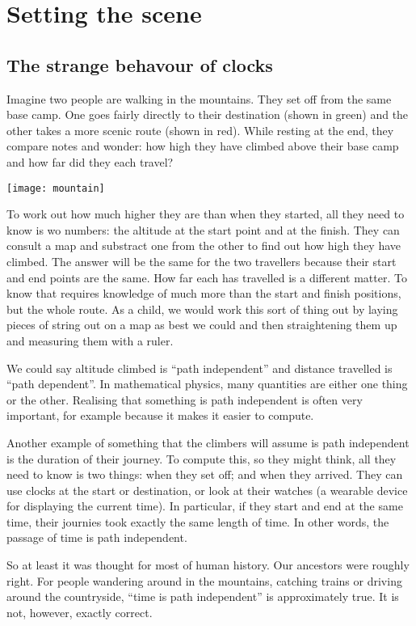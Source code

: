 \documentclass[a4paper]{report}
\begin{document}
\section*{Setting the scene}
\subsection*{The strange behavour of clocks}
Imagine two people are walking in the mountains. They set off from the same base camp. One goes fairly directly to their destination (shown in green) and the other takes a more scenic route (shown in red). While resting at the end, they compare notes and wonder: how high they have climbed above their base camp and how far did they each travel?

\texttt{[image: mountain]}

To work out how much higher they are than when they started, all they need to know is wo numbers: the altitude at the start point and at the finish. They can consult a map and substract one from the other to find out how high they have climbed. The answer will be the same for the two travellers because their start and end points are the same. 
How far each has travelled is a different matter. To know that requires knowledge of much more than the start and finish positions, but the whole route. As a child, we would work this sort of thing out by laying pieces of string out on a map as best we could and then straightening them up and measuring them with a ruler. 

We could say altitude climbed is ``path independent'' and distance travelled is ``path dependent''. In mathematical physics, many quantities are either one thing or the other. Realising that something is path independent is often very important, for example  because it makes it easier to compute. 

Another example of something that the climbers will assume is path independent is the duration of their journey. To compute this, so they might think, all they need to know is two things: when they set off; and when they arrived. They can use clocks at the start or destination, or look at their watches (a wearable device for displaying the current time). In particular, if they start and end at the same time, their journies took exactly the same length of time. In other words, the passage of time is path independent.

So at least it was thought for most of human history. Our ancestors were roughly right. For people wandering around in the mountains, catching trains or driving around the countryside, ``time is path independent'' is approximately true. It is not, however, exactly correct. 
\end{document}
